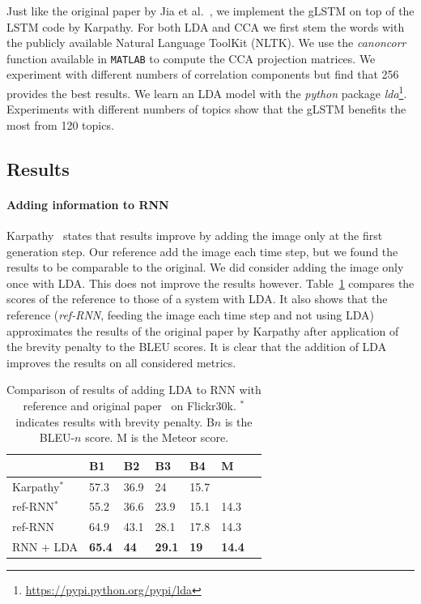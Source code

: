 \documentclass[twoside,twocolumn]{article}
\begin{document}
	Just like the original paper by Jia et al.~\cite{Fernando2015}, we implement the gLSTM on top of the LSTM code by Karpathy.
	For both LDA and CCA we first stem the words with the publicly available Natural Language ToolKit (NLTK)\cite{bird2009natural}.
	We use the \emph{canoncorr} function available in \texttt{MATLAB} to compute the CCA projection matrices. We experiment with different numbers of correlation components but find that 256 provides the best results.
	We learn an LDA model with the \emph{python} package \emph{lda}\footnote{\url{https://pypi.python.org/pypi/lda}}. 
	Experiments with different numbers of topics show that the gLSTM benefits the most from 120 topics.
	
	
	\subsection{Results}
	\paragraph{Adding information to RNN}
	Karpathy~\cite{Karpathy2015} states that results improve by adding the image only at the first generation step. Our reference add the image each time step, but we found the results to be comparable to the original. We did consider adding the image only once with LDA. This does not improve the results however.
	Table~\ref{table:results_rnn} compares the scores of the reference to those of a system with LDA. It also shows that the reference (\emph{ref-RNN}, feeding the image each time step and not using LDA) approximates the results of the original paper by Karpathy after application of the brevity penalty to the BLEU scores. 
	It is clear that the addition of LDA improves the results on all considered metrics.
	
	\begin{table}
		\centering
		\begin{tabular}{lllllll}
			& B1 & B2 & B3 & B4 & M \\ \hline
			Karpathy$^*$~\cite{Karpathy2015}    & 57.3   & 36.9   & 24     & 15.7   & ~           \\    
			ref-RNN$^*$     & 55.2   & 36.6   & 23.9   & 15.1   & 14.3          \\
			ref-RNN          & 64.9  & 43.1     & 28.1   & 17.8   & 14.3          \\
			RNN + LDA         & \textbf{65.4}   & \textbf{44}     & \textbf{29.1}   & \textbf{19}     & \textbf{14.4}          \\\hline
		\end{tabular}
		\caption{Comparison of results of adding LDA to RNN with reference and original paper~\cite{Karpathy2015} on Flickr30k. $^{*}$ indicates results with brevity penalty. B$n$ is the BLEU-$n$ score. M is the Meteor score.}
		\label{table:results_rnn}
	\end{table}
	
\end{document}
